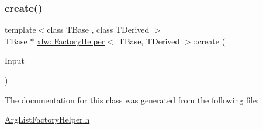 \subsubsection{\texorpdfstring{create()}{create()}}
{\footnotesize\ttfamily template$<$class T\+Base , class T\+Derived $>$ \\
T\+Base $\ast$ \hyperlink{classxlw_1_1FactoryHelper}{xlw\+::\+Factory\+Helper}$<$ T\+Base, T\+Derived $>$\+::create (\begin{DoxyParamCaption}\item[{const Argument\+List \&}]{Input }\end{DoxyParamCaption})\hspace{0.3cm}{\ttfamily [static]}}



The documentation for this class was generated from the following file\+:\begin{DoxyCompactItemize}
\item 
\hyperlink{ArgListFactoryHelper_8h}{Arg\+List\+Factory\+Helper.\+h}\end{DoxyCompactItemize}
